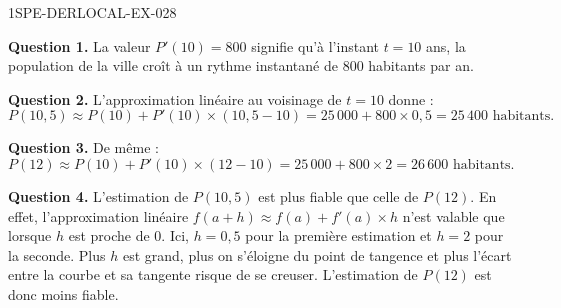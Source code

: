 \begin{corrige}{1SPE-DERLOCAL-EX-028}

\textbf{Question 1.} La valeur $P'(10) = 800$ signifie qu'à l'instant $t = 10$ ans, la population de la ville croît à un rythme instantané de $800$ habitants par an.

\textbf{Question 2.} L'approximation linéaire au voisinage de $t = 10$ donne :
\[
P(10{,}5) \approx P(10) + P'(10) \times (10{,}5 - 10) = 25\,000 + 800 \times 0{,}5 = \boxed{25\,400 \text{ habitants}}.
\]

\textbf{Question 3.} De même :
\[
P(12) \approx P(10) + P'(10) \times (12 - 10) = 25\,000 + 800 \times 2 = \boxed{26\,600 \text{ habitants}}.
\]

\textbf{Question 4.} L'estimation de $P(10{,}5)$ est plus fiable que celle de $P(12)$. En effet, l'approximation linéaire $f(a+h) \approx f(a) + f'(a) \times h$ n'est valable que lorsque $h$ est proche de $0$. Ici, $h = 0{,}5$ pour la première estimation et $h = 2$ pour la seconde. Plus $h$ est grand, plus on s'éloigne du point de tangence et plus l'écart entre la courbe et sa tangente risque de se creuser. L'estimation de $P(12)$ est donc moins fiable.

\end{corrige}
